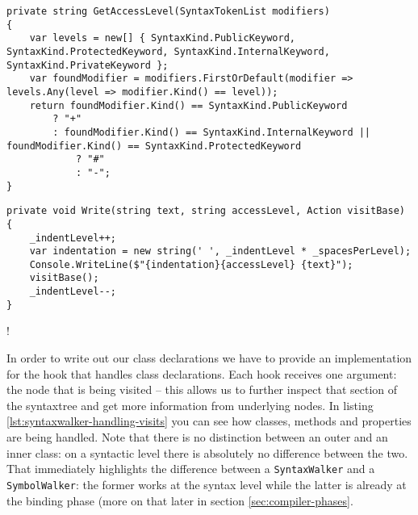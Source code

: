 \begin{minipage}{\linewidth}
\begin{lstlisting}[label={lst:syntaxwalker-extracting-access-modifier}]
private string GetAccessLevel(SyntaxTokenList modifiers)
{
    var levels = new[] { SyntaxKind.PublicKeyword, SyntaxKind.ProtectedKeyword, SyntaxKind.InternalKeyword, SyntaxKind.PrivateKeyword };
    var foundModifier = modifiers.FirstOrDefault(modifier => levels.Any(level => modifier.Kind() == level));
    return foundModifier.Kind() == SyntaxKind.PublicKeyword
		? "+"
		: foundModifier.Kind() == SyntaxKind.InternalKeyword || foundModifier.Kind() == SyntaxKind.ProtectedKeyword
			? "#"
			: "-";
}
\end{lstlisting}

\begin{lstlisting}[label={lst:syntaxwalker-write-to-console}]
private void Write(string text, string accessLevel, Action visitBase)
{
    _indentLevel++;
    var indentation = new string(' ', _indentLevel * _spacesPerLevel);
    Console.WriteLine($"{indentation}{accessLevel} {text}");
    visitBase();
	_indentLevel--;
}
\end{lstlisting}
\end{minipage}
\ifx{\verb+$+}!\fi %

In order to write out our class declarations we have to provide an implementation for the hook that handles class declarations. Each hook receives one argument: the node that is being visited -- this allows us to further inspect that section of the \gls{syntaxtree} and get more information from underlying nodes. In listing \ref{lst:syntaxwalker-handling-visits} you can see how classes, methods and properties are being handled. Note that there is no distinction between an outer and an inner class: on a syntactic level there is absolutely no difference between the two. That immediately highlights the difference between a \texttt{SyntaxWalker} and a \texttt{SymbolWalker}: the former works at the \gls{syntax} level while the latter is already at the binding phase (more on that later in section \ref{sec:compiler-phases}.

